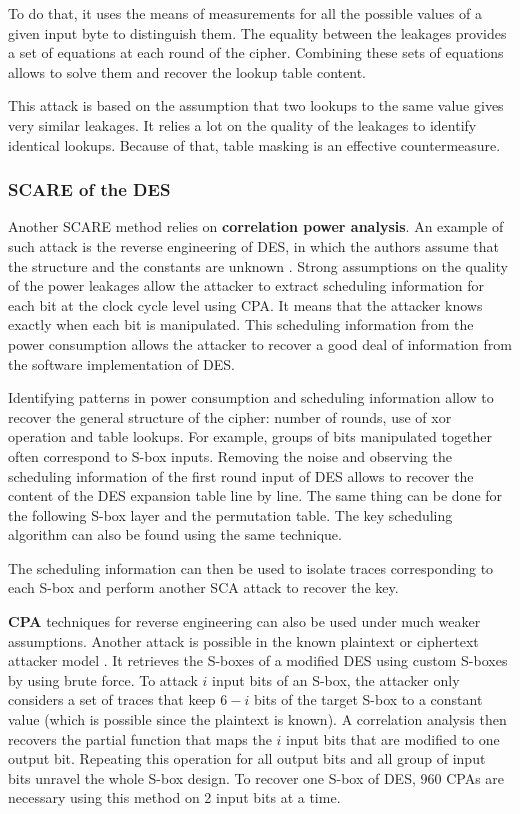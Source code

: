 \documentclass[11pt]{sdm}
\begin{document}
To do that, it uses the means of measurements for all the possible values of a given input byte to distinguish them.
The equality between the leakages provides a set of equations at each round of the cipher.
Combining these sets of equations allows to solve them and recover the lookup table content.

This attack is based on the assumption that two lookups to the same value gives very similar leakages.
It relies a lot on the quality of the leakages to identify identical lookups.
Because of that, table masking is an effective countermeasure.


\subsubsection{SCARE of the DES}

Another SCARE method relies on \textbf{correlation power analysis}.
An example of such attack is the reverse engineering of DES, in which the authors assume that the structure and the constants are unknown \parencite{Daudigny_Ledig_Muller_Valette_2005}.
Strong assumptions on the quality of the power leakages allow the attacker to extract scheduling information for each bit at the clock cycle level using CPA.
It means that the attacker knows exactly when each bit is manipulated.
This scheduling information from the power consumption allows the attacker to recover a good deal of information from the software implementation of DES.

Identifying patterns in power consumption and scheduling information allow to recover the general structure of the cipher: number of rounds, use of xor operation and table lookups.
For example, groups of bits manipulated together often correspond to S-box inputs.
Removing the noise and observing the scheduling information of the first round input of DES allows to recover the content of the DES expansion table line by line.
The same thing can be done for the following S-box layer and the permutation table.
The key scheduling algorithm can also be found using the same technique.

The scheduling information can then be used to isolate traces corresponding to each S-box and perform another SCA attack to recover the key.


\textbf{CPA} techniques for reverse engineering can also be used under much weaker assumptions.
Another attack is possible in the known plaintext or ciphertext attacker model \parencite{Guilley_Sauvage_Micolod_Réal_Valette_2010}.
It retrieves the S-boxes of a modified DES using custom S-boxes by using brute force.
To attack $i$ input bits of an S-box, the attacker only considers a set of traces that keep $6-i$ bits of the target S-box to a constant value (which is possible since the plaintext is known).
A correlation analysis then recovers the partial function that maps the $i$ input bits that are modified to one output bit.
Repeating this operation for all output bits and all group of input bits unravel the whole S-box design.
To recover one S-box of DES, 960 CPAs are necessary using this method on 2 input bits at a time.
\end{document}

